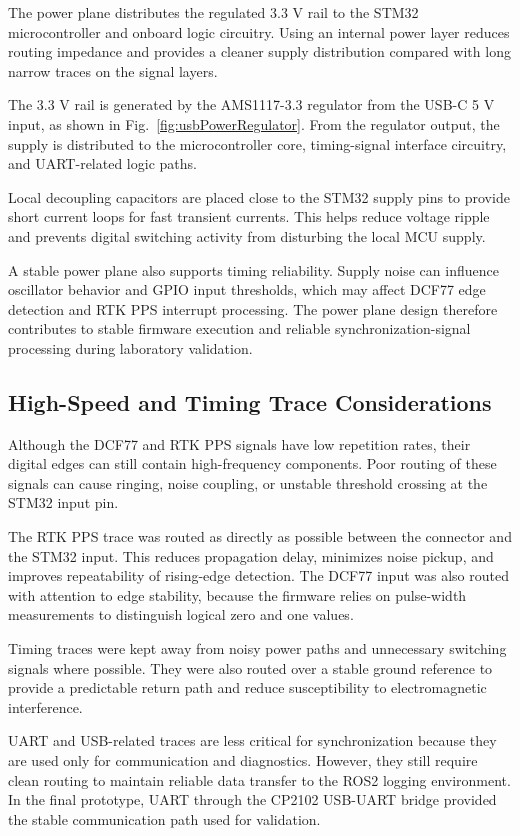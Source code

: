 The power plane distributes the regulated 3.3 V rail to the STM32 microcontroller and onboard logic circuitry. Using an internal power layer reduces routing impedance and provides a cleaner supply distribution compared with long narrow traces on the signal layers.

The 3.3 V rail is generated by the AMS1117-3.3 regulator from the USB-C 5 V input, as shown in Fig.~\ref{fig:usbPowerRegulator}. From the regulator output, the supply is distributed to the microcontroller core, timing-signal interface circuitry, and UART-related logic paths.

Local decoupling capacitors are placed close to the STM32 supply pins to provide short current loops for fast transient currents. This helps reduce voltage ripple and prevents digital switching activity from disturbing the local MCU supply.

A stable power plane also supports timing reliability. Supply noise can influence oscillator behavior and GPIO input thresholds, which may affect DCF77 edge detection and RTK PPS interrupt processing. The power plane design therefore contributes to stable firmware execution and reliable synchronization-signal processing during laboratory validation.

\subsection{High-Speed and Timing Trace Considerations}

Although the DCF77 and RTK PPS signals have low repetition rates, their digital edges can still contain high-frequency components. Poor routing of these signals can cause ringing, noise coupling, or unstable threshold crossing at the STM32 input pin.

The RTK PPS trace was routed as directly as possible between the connector and the STM32 input. This reduces propagation delay, minimizes noise pickup, and improves repeatability of rising-edge detection. The DCF77 input was also routed with attention to edge stability, because the firmware relies on pulse-width measurements to distinguish logical zero and one values.

Timing traces were kept away from noisy power paths and unnecessary switching signals where possible. They were also routed over a stable ground reference to provide a predictable return path and reduce susceptibility to electromagnetic interference.

UART and USB-related traces are less critical for synchronization because they are used only for communication and diagnostics. However, they still require clean routing to maintain reliable data transfer to the ROS2 logging environment. In the final prototype, UART through the CP2102 USB-UART bridge provided the stable communication path used for validation.

